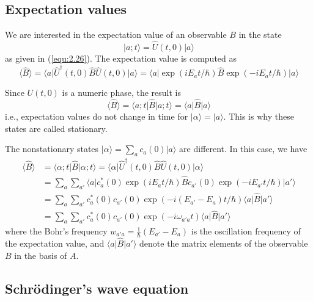 \subsection{Expectation values}
We are interested in the expectation value of an observable
$B$ in the state
$$
  \vert a;t\rangle  = \hat{U}(t,0) \vert a\rangle 
$$
as given in (\ref{equ:2.26}). The expectation value is
computed as
$$
\langle \hat{B}\rangle  = \langle a\vert \hat{U}^{\dagger}(t,0) \hat{B} \hat{U}(t,0) \vert a\rangle 
= 
\langle a\vert \exp(iE_a t/\hbar) \hat{B} \exp(-i E_a t/\hbar) \vert a\rangle 
$$

Since $U(t,0)$ is a numeric phase, the result is
\begin{equation}
  \langle \hat{B}\rangle  = \langle a;t\vert \hat{B}\vert a;t\rangle  = \langle a\vert \hat{B}\vert a\rangle 
  \label{equ:2.26}
\end{equation}
i.e., expectation values do not change in time for $\vert \alpha\rangle 
= \vert a\rangle $. This is why these states are called stationary.

The nonstationary states $\vert \alpha\rangle  = \sum_a c_a(0) \vert a\rangle $ are
different. In this case, we have
\begin{align}
  \langle \hat{B}\rangle  &= \langle \alpha;t\vert \hat{B}\vert \alpha;t\rangle  =
  \langle \alpha\vert \hat{U}^{\dagger}(t,0)
  \hat{B}\hat{U}(t,0)\vert \alpha\rangle \nonumber\\
  &=
  \sum_a \sum_{a'} \langle a\vert c^*_a(0) \exp(i E_a t/\hbar)
  \hat{B}c_{a'}(0)\exp(-i E_{a'} t/\hbar)\vert a'\rangle
  \nonumber\\
  &=
  \sum_a \sum_{a'} c_a^*(0) c_{a'}(0) \exp(-i (E_{a'}-E_a)t/
  \hbar) \langle a\vert \hat{B}\vert a'\rangle \nonumber\\
  &=
  \sum_a \sum_{a'} c_a^*(0) c_{a'}(0) \exp(-i \omega_{a' a}t)
  \langle a\vert \hat{B}\vert a'\rangle 
  \label{equ:2.27}
\end{align}
where the Bohr's frequency $w_{a'a} =
\frac{1}{\hbar}(E_{a'}-E_a)$ is the oscillation frequency of
the expectation value, and $\langle a\vert \hat{B}\vert a'\rangle $ denote the
matrix elements of the observable $B$ in the basis of $A$.

\subsection{Schrödinger's wave equation}
